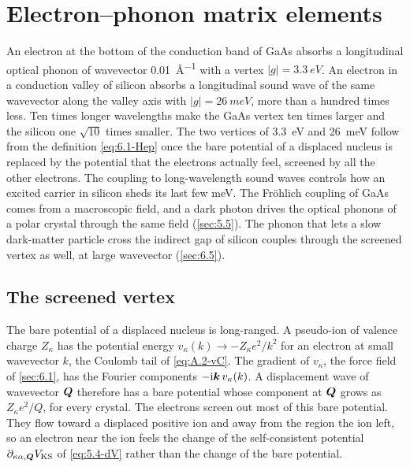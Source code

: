 \section{Electron--phonon matrix elements}\label{sec:6.2}

An electron at the bottom of the conduction band of GaAs absorbs a longitudinal optical phonon of wavevector \SI{0.01}{\angstrom^{-1}} with a vertex $|g| = \SI{3.3}{eV}$. An electron in a conduction valley of silicon absorbs a longitudinal sound wave of the same wavevector along the valley axis with $|g| = \SI{26}{meV}$, more than a hundred times less. Ten times longer wavelengths make the GaAs vertex ten times larger and the silicon one $\sqrt{10}$ times smaller. The two vertices of \SI{3.3}{eV} and \SI{26}{meV} follow from the definition \cref{eq:6.1-Hep} once the bare potential of a displaced nucleus is replaced by the potential that the electrons actually feel, screened by all the other electrons. The coupling to long-wavelength sound waves controls how an excited carrier in silicon sheds its last few meV. The Fr\"ohlich coupling of GaAs comes from a macroscopic field, and a dark photon drives the optical phonons of a polar crystal through the same field (\cref{sec:5.5}). The phonon that lets a slow dark-matter particle cross the indirect gap of silicon couples through the screened vertex as well, at large wavevector (\cref{sec:6.5}).

\subsection{The screened vertex}

The bare potential of a displaced nucleus is long-ranged. A pseudo-ion of valence charge $Z_\kappa$ has the potential energy $v_\kappa(k) \to -Z_\kappa e^2/k^2$ for an electron at small wavevector $k$, the Coulomb tail of \cref{eq:A.2-vC}. The gradient of $v_\kappa$, the force field of \cref{sec:6.1}, has the Fourier components $-\mathrm{i}\bm{k}\,v_\kappa(k)$. A displacement wave of wavevector $\bm{Q}$ therefore has a bare potential whose component at $\bm{Q}$ grows as $Z_\kappa e^2/Q$, for every crystal. The electrons screen out most of this bare potential. They flow toward a displaced positive ion and away from the region the ion left, so an electron near the ion feels the change of the self-consistent potential $\partial_{\kappa\alpha,\bm{Q}}V_{\mathrm{KS}}$ of \cref{eq:5.4-dV} rather than the change of the bare potential.

